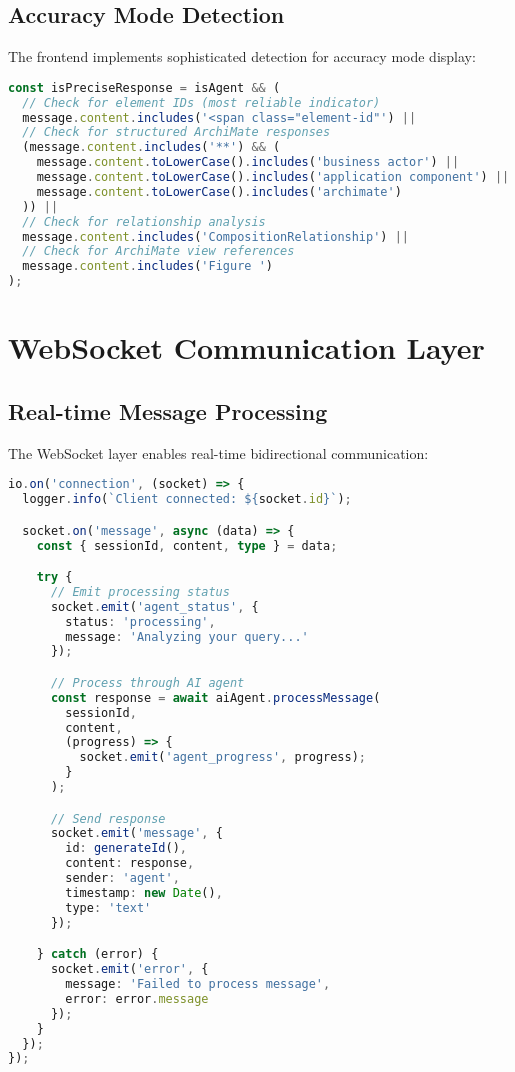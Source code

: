 \documentclass[12pt,a4paper]{report}
\begin{document}
\subsection{Accuracy Mode Detection}

The frontend implements sophisticated detection for accuracy mode display:

\begin{lstlisting}[language=TypeScript, caption=Enhanced Accuracy Mode Detection]
const isPreciseResponse = isAgent && (
  // Check for element IDs (most reliable indicator)
  message.content.includes('<span class="element-id"') ||
  // Check for structured ArchiMate responses
  (message.content.includes('**') && (
    message.content.toLowerCase().includes('business actor') ||
    message.content.toLowerCase().includes('application component') ||
    message.content.toLowerCase().includes('archimate')
  )) ||
  // Check for relationship analysis
  message.content.includes('CompositionRelationship') ||
  // Check for ArchiMate view references
  message.content.includes('Figure ')
);
\end{lstlisting}

\section{WebSocket Communication Layer}

\subsection{Real-time Message Processing}

The WebSocket layer enables real-time bidirectional communication:

\begin{lstlisting}[language=TypeScript, caption=WebSocket Implementation]
io.on('connection', (socket) => {
  logger.info(`Client connected: ${socket.id}`);

  socket.on('message', async (data) => {
    const { sessionId, content, type } = data;

    try {
      // Emit processing status
      socket.emit('agent_status', {
        status: 'processing',
        message: 'Analyzing your query...'
      });

      // Process through AI agent
      const response = await aiAgent.processMessage(
        sessionId,
        content,
        (progress) => {
          socket.emit('agent_progress', progress);
        }
      );

      // Send response
      socket.emit('message', {
        id: generateId(),
        content: response,
        sender: 'agent',
        timestamp: new Date(),
        type: 'text'
      });

    } catch (error) {
      socket.emit('error', {
        message: 'Failed to process message',
        error: error.message
      });
    }
  });
});
\end{lstlisting}
\end{document}

